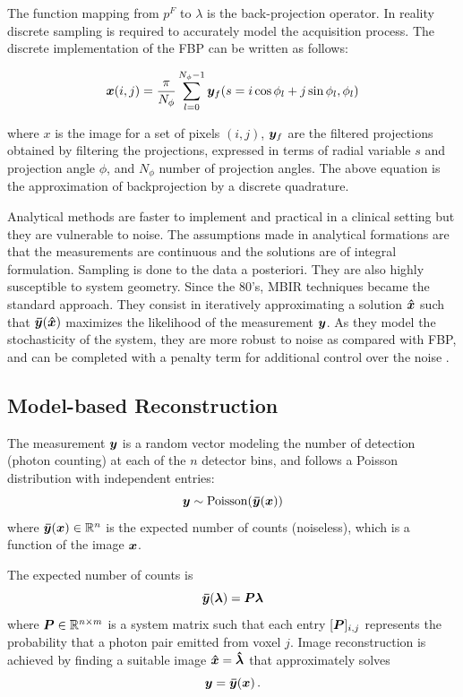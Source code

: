 The function mapping from $p^{F}$ to $\lambda$ is the back-projection operator. 
In reality discrete sampling is required to accurately model the acquisition process. The discrete implementation of the \ac{FBP} can be written as follows:

\begin{equation}\label{eq:FBP}
\bm{x}(i,j) = \frac{\pi}{N_\phi}\sum_{l=0}^{N_\phi-1}\bm{y}_f(s=i\cos\phi_l+j\sin\phi_l,\phi_l)
\end{equation}

where $x$ is the image for a set of pixels $(i,j)$, $\bm{y}_f$ are the filtered projections obtained by filtering the projections, expressed in terms of radial variable $s$ and projection angle $\phi$, and $N_\phi$ number of projection angles. The above equation is the approximation of backprojection by a discrete quadrature. 

Analytical methods are faster to implement and practical in a clinical setting but they are vulnerable to noise. The assumptions made in analytical formations are that the measurements are continuous and the solutions are of integral formulation. Sampling is done to the data a posteriori. They are also highly susceptible to system geometry. Since the 80's, \ac{MBIR} techniques \cite{Shepp1982,fessler2000statistical} became the standard approach. They consist in iteratively approximating a solution $\bm{\hat{x}}$ such that $\bm{\bar{y}}(\bm{\hat{x}})$ maximizes the likelihood of the measurement $\bm{y}$. As they model the stochasticity of the system, they are more robust to noise as compared with \ac{FBP}, and can be completed with a penalty term for additional control over the noise \cite{depierro1995}.


\subsection{Model-based Reconstruction}
The measurement $\bm{y}$ is a random vector modeling the number of detection (photon counting) at each of the $n$ detector bins, and follows a Poisson distribution with independent entries:
\begin{equation}\label{eq:poisson}
\bm{y} \sim \mathrm{Poisson}(\bm{\bar{y}}(\bm{x}))
\end{equation}    
where $\bm{\bar{y}}(\bm{x}) \in \mathbb{R}^n$ is the expected number of counts (noiseless), which is a function of the image $\bm{x}$. 

The expected number of counts is
\begin{equation}\label{eq:PET}
\bm{\bar{y}}(\bm{\lambda}) = \bm{P} \bm{\lambda}
\end{equation}
where $\bm{P} \in \mathbb{R}^{n\times m}$ is a system matrix such that each entry $[\bm{P}]_{i,j}$ represents the probability that a photon pair emitted from voxel $j$. Image reconstruction is achieved by finding a suitable image $\bm{\hat{x}} = \bm{\hat{\lambda}}$ that approximately solves 
\begin{equation}\label{eq:pb1solve}
\bm{y} = \bm{\bar{y}}(\bm{x}) \, .
\end{equation} 


